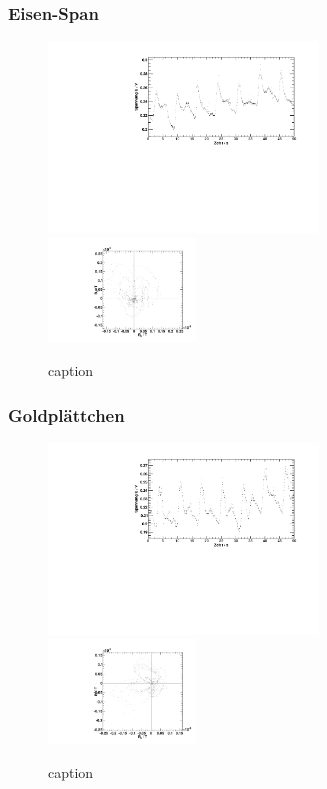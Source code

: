 \subsubsection{Eisen-Span}
\begin{figure}[H]
\begin{center}
  \includegraphics[width=0.64\textwidth]{../img/Fe-Span.pdf}
  \includegraphics[width=0.35\textwidth]{../img/polar_Fe-Span.pdf}
  \caption{caption}
  \label{img:fespan}
\end{center}
\end{figure}

\subsubsection{Goldplättchen}
\begin{figure}[H]
\begin{center}
  \includegraphics[width=0.64\textwidth]{../img/Au-Plaettchen.pdf}
  \includegraphics[width=0.35\textwidth]{../img/polar_Au-Plaettchen.pdf}
  \caption{caption}
  \label{img:au}
\end{center}
\end{figure}

